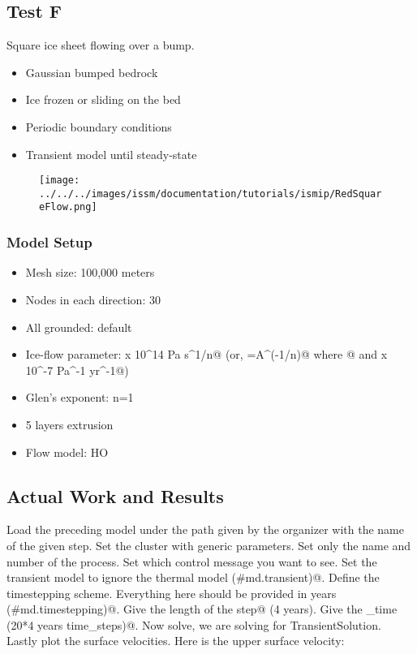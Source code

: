 \subsection{Test F} %
Square ice sheet flowing over a bump.
\begin{itemize}
	\item Gaussian bumped bedrock
	\item Ice frozen or sliding on the bed
	\item Periodic boundary conditions
	\item Transient model until steady-state
\end{itemize}
\begin{figure}[H]
	\begin{center}
		\texttt{[image: ../../../images/issm/documentation/tutorials/ismip/RedSquareFlow.png]}
	\end{center}
\end{figure}
\subsubsection{Model Setup}
\begin{itemize}
	\item Mesh size: 100,000 meters
	\item Nodes in each direction: 30
	\item All grounded: default
	\item Ice-flow parameter:  x 10^14 Pa s^1/n@ (or, \verb@B=A^(-1/n)@ where @ and  x 10^-7 Pa^-1 yr^-1@)
	\item Glen's exponent: n=1
	\item 5 layers extrusion
	\item Flow model: HO
\end{itemize}
\subsection{Actual Work and Results} %
Load the preceding model under the path given by the organizer with the name of the given step. Set the cluster with generic parameters. Set only the name and number of the process. Set which control message you want to see. Set the transient model to ignore the thermal model \verb@(#md.transient)@. Define the timestepping scheme. Everything here should be provided in years \verb@(#md.timestepping)@. Give the length of the \verb@time step@ (4 years). Give the \verb@final_time (20*4 years time_steps)@. Now solve, we are solving for TransientSolution. Lastly plot the surface velocities. Here is the upper surface velocity:

